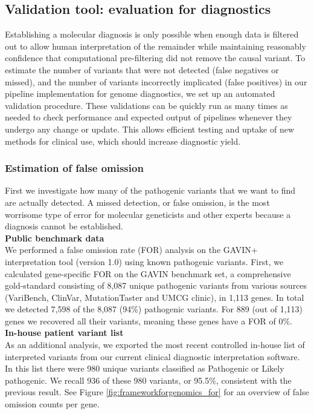 \subsection{Validation tool: evaluation for diagnostics}

Establishing a molecular diagnosis is only possible when enough data is filtered out to allow human interpretation of the remainder while maintaining reasonably confidence that computational pre-filtering did not remove the causal variant.
To estimate the number of variants that were not detected (false negatives or missed), and the number of variants incorrectly implicated (false positives) in our pipeline implementation for genome diagnostics, we set up an automated validation procedure.
These validations can be quickly run as many times as needed to check performance and expected output of pipelines whenever they undergo any change or update.
This allows efficient testing and uptake of new methods for clinical use, which should increase diagnostic yield.

\subsubsection{Estimation of false omission}

First we investigate how many of the pathogenic variants that we want to find are actually detected.
A missed detection, or false omission, is the most worrisome type of error for molecular geneticists and other experts because a diagnosis cannot be established.\\

\noindent\textbf{Public benchmark data}\\
We performed a false omission rate (FOR) analysis on the GAVIN+ interpretation tool (version 1.0) using known pathogenic variants.
First, we calculated gene-specific FOR on the GAVIN\cite{van_der_Velde_2017} benchmark set, a comprehensive gold-standard consisting of 8,087 unique pathogenic variants from various sources (VariBench, ClinVar, MutationTaster and UMCG clinic), in 1,113 genes.
In total we detected 7,598 of the 8,087 (94\%) pathogenic variants. For 889 (out of 1,113) genes we recovered all their variants, meaning these genes have a FOR of 0\%.\\

\noindent\textbf{In-house patient variant list}\\
As an additional analysis, we exported the most recent controlled in-house list of interpreted variants from our current clinical diagnostic interpretation software.
In this list there were 980 unique variants classified as Pathogenic or Likely pathogenic.
We recall 936 of these 980 variants, or 95.5\%, consistent with the previous result.
See Figure \ref{fig:frameworkforgenomics_for} for an overview of false omission counts per gene.\\

